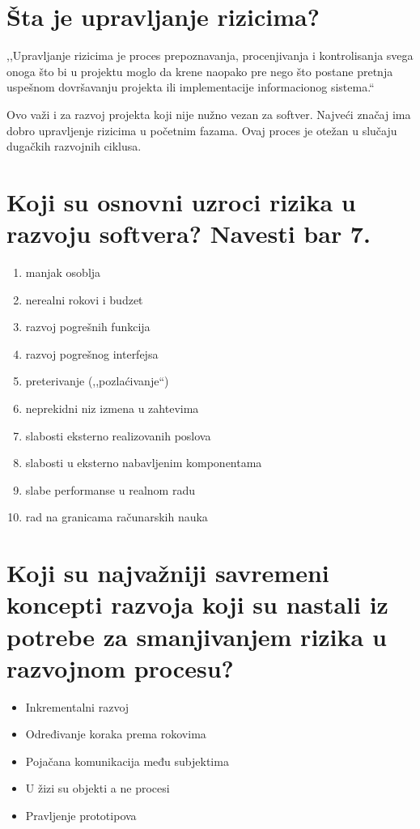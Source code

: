 \documentclass[a4paper]{article}
\begin{document}
\section{Šta je upravljanje rizicima?}
      ,,Upravljanje rizicima je proces prepoznavanja, procenjivanja i kontrolisanja 
      svega onoga što bi u projektu moglo da krene naopako pre nego što 
      postane pretnja uspešnom dovršavanju projekta ili implementacije 
      informacionog sistema.``
  \\[5pt]

  Ovo važi i za razvoj projekta koji nije nužno vezan za softver. Najveći značaj ima 
  dobro upravljenje rizicima u početnim fazama. Ovaj proces je otežan u slučaju dugačkih 
  razvojnih ciklusa.
 
\section{Koji su osnovni uzroci rizika u razvoju softvera? Navesti bar 7.}
  \begin{enumerate}
  \item manjak osoblja
  \item nerealni rokovi i budzet
  \item razvoj pogrešnih funkcija
  \item razvoj pogrešnog interfejsa
  \item preterivanje (,,pozlaćivanje``)
  \item neprekidni niz izmena u zahtevima
  \item slabosti eksterno realizovanih poslova
  \item slabosti u eksterno nabavljenim komponentama
  \item slabe performanse u realnom radu
  \item rad na granicama računarskih nauka
  \end{enumerate}

\section{Koji su najvažniji savremeni koncepti razvoja koji su nastali iz potrebe 
         za smanjivanjem rizika u razvojnom procesu?}
  \begin{itemize}
    \item Inkrementalni razvoj
    \item Određivanje koraka prema rokovima
    \item Pojačana komunikacija među subjektima
    \item U žizi su objekti a ne procesi
    \item Pravljenje prototipova
  \end{itemize}
\end{document}
